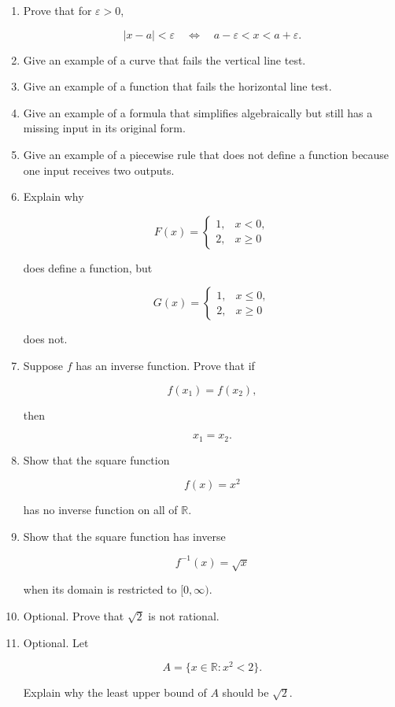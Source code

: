 \begin{enumerate}
\item Prove that for \(\varepsilon>0\),

\[
|x-a|<\varepsilon
\quad\Longleftrightarrow\quad
a-\varepsilon<x<a+\varepsilon.
\]

\item Give an example of a curve that fails the vertical line test.

\item Give an example of a function that fails the horizontal line test.

\item Give an example of a formula that simplifies algebraically but still has a missing input in its original form.

\item Give an example of a piecewise rule that does not define a function because one input receives two outputs.

\item Explain why

\[
F(x)=
\begin{cases}
1, & x<0,\\
2, & x\ge 0
\end{cases}
\]

does define a function, but

\[
G(x)=
\begin{cases}
1, & x\le 0,\\
2, & x\ge 0
\end{cases}
\]

does not.

\item Suppose \(f\) has an inverse function. Prove that if

\[
f(x_1)=f(x_2),
\]

then

\[
x_1=x_2.
\]

\item Show that the square function

\[
f(x)=x^2
\]

has no inverse function on all of \(\mathbb R\).

\item Show that the square function has inverse

\[
f^{-1}(x)=\sqrt{x}
\]

when its domain is restricted to \([0,\infty)\).

\item Optional. Prove that \(\sqrt2\) is not rational.

\item Optional. Let

\[
A=\{x\in\mathbb R:x^2<2\}.
\]

Explain why the least upper bound of \(A\) should be \(\sqrt2\).
\end{enumerate}

